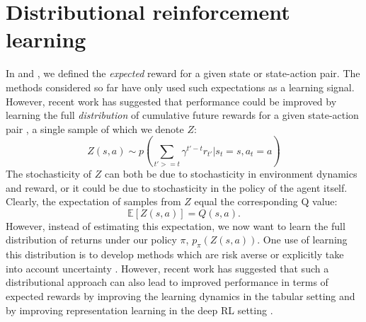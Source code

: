 \section*{Distributional reinforcement learning}
\label{sec:distributional}

In  and , we defined the \emph{expected} reward for a given state or state-action pair.
The methods considered so far have only used such expectations as a learning signal.
However, recent work has suggested that performance could be improved by learning the full \emph{distribution} of cumulative future rewards for a given state-action pair \citep{bellemare2017distributional, bellemare2023distributional,dabney2018distributional}, a single sample of which we denote $Z$:
\begin{equation}
    Z(s, a) \sim p \left ( \sum_{t' >= t} \gamma^{t' - t} r_{t'} | s_t = s, a_t = a \right )
\end{equation}
The stochasticity of $Z$ can both be due to stochasticity in environment dynamics and reward, or it could be due to stochasticity in the policy of the agent itself.
Clearly, the expectation of samples from $Z$ equal the corresponding Q value:
\begin{equation}
    \mathbb{E} \left [ Z(s, a) \right ] = Q(s, a).
\end{equation}
However, instead of estimating this expectation, we now want to learn the full distribution of returns under our policy $\pi$, $p_\pi(Z(s, a))$.
One use of learning this distribution is to develop methods which are risk averse \citep{morimura2010nonparametric,morimura2012parametric} or explicitly take into account uncertainty \citep{dearden1998bayesian}.
However, recent work has suggested that such a distributional approach can also lead to improved performance in terms of expected rewards by improving the learning dynamics in the tabular setting and by improving representation learning in the deep RL setting \citep{bellemare2017distributional,dabney2018distributional,rowland2019statistics,bellemare2023distributional}.


